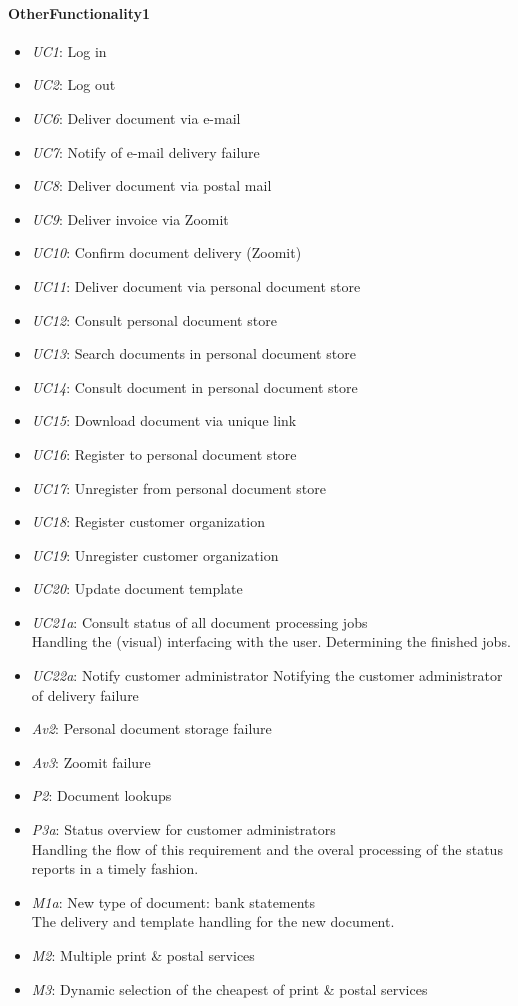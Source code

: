 \documentclass[a4paper,10pt]{article}
\begin{document}
\paragraph{OtherFunctionality1}
\begin{itemize}
    \item \emph{UC1}: Log in
    \item \emph{UC2}: Log out
    \item \emph{UC6}: Deliver document via e-mail
    \item \emph{UC7}: Notify of e-mail delivery failure
    \item \emph{UC8}: Deliver document via postal mail
    \item \emph{UC9}: Deliver invoice via Zoomit
    \item \emph{UC10}: Confirm document delivery (Zoomit)
    \item \emph{UC11}: Deliver document via personal document store
    \item \emph{UC12}: Consult personal document store
    \item \emph{UC13}: Search documents in personal document store
    \item \emph{UC14}: Consult document in personal document store
    \item \emph{UC15}: Download document via unique link
    \item \emph{UC16}: Register to personal document store
    \item \emph{UC17}: Unregister from personal document store
    \item \emph{UC18}: Register customer organization
    \item \emph{UC19}: Unregister customer organization
    \item \emph{UC20}: Update document template
    \item \emph{UC21a}: Consult status of all document processing jobs\\
    Handling the (visual) interfacing with the user. Determining the finished jobs.
    \item \emph{UC22a}: Notify customer administrator
    Notifying the customer administrator of delivery failure
    \item \emph{Av2}: Personal document storage failure
    \item \emph{Av3}: Zoomit failure
    \item \emph{P2}: Document lookups
    \item \emph{P3a}: Status overview for customer administrators\\
    Handling the flow of this requirement and the overal processing of the status reports in a timely fashion.
    \item \emph{M1a}: New type of document: bank statements\\
    The delivery and template handling for the new document.
    \item \emph{M2}: Multiple print \& postal services
    \item \emph{M3}: Dynamic selection of the cheapest of print \& postal services
\end{itemize}
\end{document}
